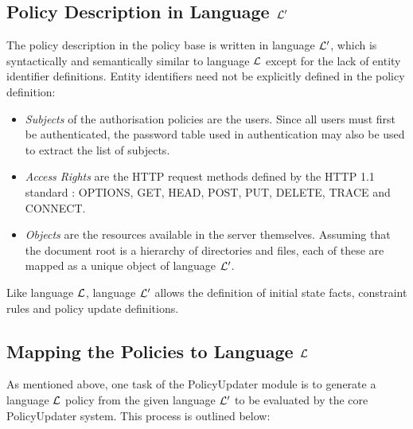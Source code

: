 \documentclass[glov2,twocolumn,final]{svjour2}
\begin{document}
    \subsection{Policy Description in Language ${\cal L'}$}

      The policy description in the policy base is written in language
      ${\cal L'}$, which is syntactically and semantically similar to
      language ${\cal L}$ except for the lack of entity identifier
      definitions. Entity identifiers need not be explicitly defined in
      the policy definition:

      \begin{itemize}
        \item
          {\em Subjects} of the authorisation policies are the users. Since
          all users must first be authenticated, the password table used
          in authentication may also be used to extract the list of subjects.
        \item
          {\em Access Rights} are the HTTP request methods defined by the
          HTTP 1.1 standard \cite{HTTP1}: OPTIONS, GET, HEAD, POST, PUT,
          DELETE, TRACE and CONNECT.
        \item
          {\em Objects} are the resources available in the server themselves.
          Assuming that the document root is a hierarchy of directories and
          files, each of these are mapped as a unique object of language
          ${\cal L'}$.
      \end{itemize}

      Like language ${\cal L}$, language ${\cal L'}$ allows the definition of
      initial state facts, constraint rules and policy update definitions.

    \subsection{Mapping the Policies to Language ${\cal L}$}

      As mentioned above, one task of the PolicyUpdater module is to generate
      a language ${\cal L}$ policy from the given language ${\cal L'}$ to be
      evaluated by the core PolicyUpdater system. This process is outlined
      below:
\end{document}
